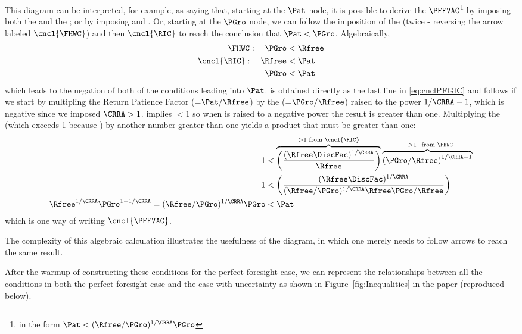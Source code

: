 \documentclass[\econtexRoot/BufferStockTheory]{subfiles}
\begin{document}
This diagram can be interpreted, for example, as saying  that, starting at the $\Pat$ node, it is possible to derive the $\PFFVAC$\footnote{in the form $\Pat < (\Rfree/\PGro)^{1/\CRRA}\PGro$} by imposing both the {\PFGIC} and the {\FHWC}; or by imposing {\RIC} and \cncl{\FHWC}.  Or, starting at the $\PGro$ node, we can follow the imposition of the {\FHWC} (twice - reversing the arrow labeled $\cncl{\FHWC}$) and then $\cncl{\RIC}$ to reach the conclusion that $\Pat < \PGro$.  Algebraically,
\begin{equation}\begin{gathered}\begin{aligned}
  {\FHWC}:~~~ \PGro & < \Rfree 
  \\ \cncl{\RIC}:~~~ \Rfree & < \Pat 
  \\ \PGro & < \Pat \label{eq:cnclPFGIC}
\end{aligned}\end{gathered}\end{equation}
which leads to the negation of both of the conditions leading into $\Pat$.  \cncl{\PFGIC} is obtained directly as the last line in \eqref{eq:cnclPFGIC} and \cncl{\PFFVAC} follows if we start by multipling the Return Patience Factor ({\RPF}=$\Pat/\Rfree$) by the \FHWF (=$\PGro/\Rfree$) raised to the power $1/\CRRA-1$, which is negative since we imposed $\CRRA > 1$.  {\FHWC} implies {\FHWF} $< 1$ so when {\FHWF} is raised to a negative power the result is greater than one.
Multiplying the {\RPF} (which exceeds 1 because \cncl{\RIC}) by another number greater than one yields a product that must be greater than one:
\begin{equation}\begin{gathered}\begin{aligned}
  1  & < \overbrace{\left(\frac{(\Rfree \DiscFac)^{1/\CRRA}}{\Rfree}\right)}^{>1 \text{~from~}\cncl{\RIC}}\overbrace{\left(\PGro/\Rfree\right)^{1/\CRRA-1}}^{\phantom{...}>1~\text{~from~} \FHWC} \notag
  \\ 1  & < \left(\frac{(\Rfree \DiscFac)^{1/\CRRA}}{(\Rfree/\PGro)^{1/\CRRA}\Rfree\PGro/\Rfree}\right) \label{eq:cnclFHWFAndcnclRICImplycnclPFFVAC}
  \\ \Rfree^{1/\CRRA}\PGro^{1 - 1/\CRRA} = (\Rfree/\PGro)^{1/\CRRA} \PGro  & < \Pat \notag
\end{aligned}\end{gathered}\end{equation}
which is one way of writing $\cncl{\PFFVAC}$.

The complexity of this algebraic calculation illustrates the usefulness of the diagram, in which one merely needs to follow arrows to reach the same result.

After the warmup of constructing these conditions for the perfect foresight case, we can represent the relationships between all the conditions in both the perfect foresight case and the case with uncertainty as shown in Figure~\ref{fig:Inequalities} in the paper (reproduced below).

\renewcommand{\figName}{Inequalities} %
\renewcommand{\figFile}{\figName} %
\hypertarget{\figFile}{}
\hypertarget{\figName}{}
\end{document}
